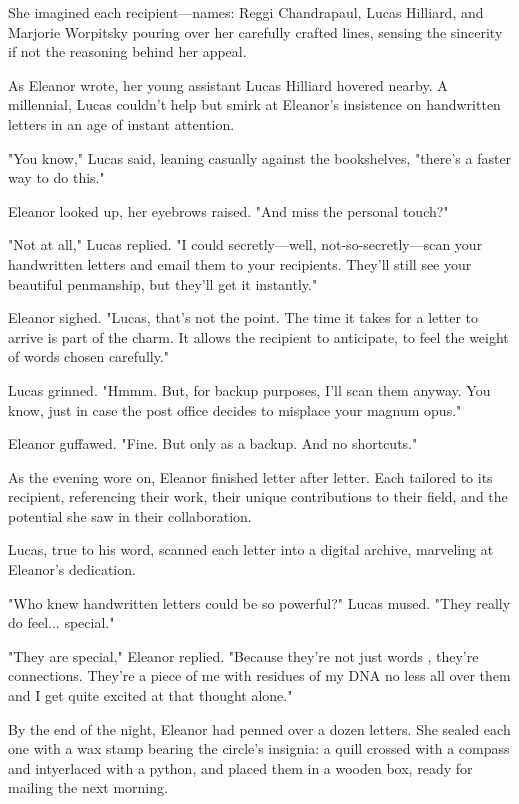 She imagined each recipient—names: Reggi Chandrapaul, Lucas Hilliard, and Marjorie Worpitsky pouring over her carefully crafted lines, sensing the sincerity if not the reasoning behind her appeal.

As Eleanor wrote, her young assistant Lucas Hilliard hovered nearby. A millennial, Lucas couldn’t help but smirk at Eleanor’s insistence on handwritten letters in an age of instant attention.

"You know," Lucas said, leaning casually against the bookshelves, "there’s a faster way to do this."

Eleanor looked up, her eyebrows raised. "And miss the personal touch?"

"Not at all," Lucas replied. "I could secretly—well, not-so-secretly—scan your handwritten letters and email them to your recipients. They’ll still see your beautiful penmanship, but they’ll get it instantly."

Eleanor sighed. "Lucas, that’s not the point. The time it takes for a letter to arrive is part of the charm. It allows the recipient to anticipate, to feel the weight of words chosen carefully."

Lucas grinned. "Hmmm. But, for backup purposes, I’ll scan them anyway. You know, just in case the post office decides to misplace your magnum opus."

Eleanor guffawed. "Fine. But only as a backup. And no shortcuts."

As the evening wore on, Eleanor finished letter after letter. Each tailored to its recipient, referencing their work, their unique contributions to their field, and the potential she saw in their collaboration. 

Lucas, true to his word, scanned each letter into a digital archive, marveling at Eleanor’s dedication.

"Who knew handwritten letters could be so powerful?" Lucas mused. "They really do feel... special."

"They are special," Eleanor replied. "Because they’re not just words
, they’re connections. They’re a piece of me with residues of my DNA no less all over them and I get quite excited at that thought alone."

By the end of the night, Eleanor had penned over a dozen letters. She sealed each one with a wax stamp bearing the circle's insignia: a quill crossed with a compass and intyerlaced with a python, and placed them in a wooden box, ready for mailing the next morning.

